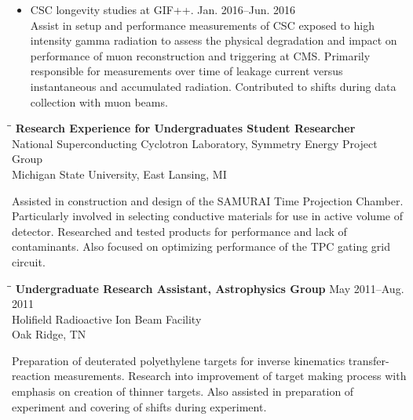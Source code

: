 \documentclass[10pt]{res} %
\begin{document}
\begin{resume}
\begin{itemize}
  \item CSC longevity studies at GIF++. \hfill{Jan. 2016--Jun. 2016} \\
    Assist in setup and performance measurements
    of CSC exposed to high intensity gamma radiation to assess the physical degradation and impact on performance
    of muon reconstruction and triggering at CMS. Primarily responsible for measurements over time of leakage current
    versus instantaneous and accumulated radiation. Contributed to shifts during data collection with muon beams.
\end{itemize}

\begin{tabbing}
\hspace{2.3in}\= \hspace{2.5in}\= \kill %
  \textbf{Research Experience for Undergraduates Student Researcher} \> \\
National Superconducting Cyclotron Laboratory, Symmetry Energy Project Group \\
Michigan State University, East Lansing, MI \\
\end{tabbing}\vspace{-20pt}      %

Assisted in construction and design of the SAMURAI Time Projection Chamber. 
Particularly involved in selecting conductive materials for use in active 
volume of detector. Researched and tested products for performance and lack 
of contaminants. Also focused on optimizing performance of the TPC gating grid circuit.

\begin{tabbing}
\hspace{2.3in}\= \hspace{2.5in}\= \kill %
\textbf{Undergraduate Research Assistant, Astrophysics Group} \>\> May 2011--Aug. 2011\\
Holifield Radioactive Ion Beam Facility \\
Oak Ridge, TN \\
\end{tabbing}\vspace{-20pt}      %

Preparation of deuterated polyethylene targets for inverse kinematics 
transfer-reaction measurements. Research into improvement of 
target making process with emphasis on creation of thinner targets. 
Also assisted in preparation of experiment and covering of shifts 
during experiment.


\end{resume}
\end{document}
